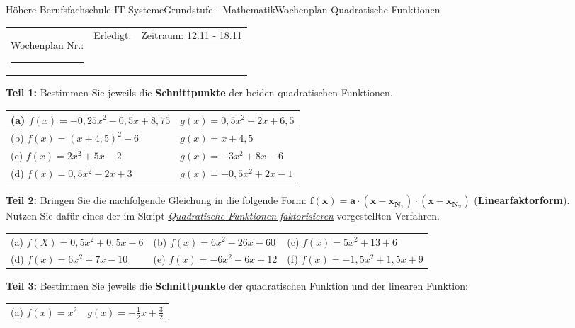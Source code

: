 \documentclass[oneside,openany,headings=optiontotoc,11pt,numbers=noenddot]{scrreprt}
\begin{document}
	\begin{worksheet}{Höhere Berufsfachschule IT-Systeme}{Grundstufe - Mathematik}{Wochenplan Quadratische Funktionen}
		\noindent
		\begin{tabularx}{\textwidth}{XXl}
			Wochenplan Nr.: \rule{0.15\textwidth}{1pt} & Erledigt: & Zeitraum: \underline{12.11 - 18.11}
		\end{tabularx}
	
		\begin{framed}
			\noindent
			\textbf{Teil 1:} Bestimmen Sie jeweils die \textbf{Schnittpunkte} der beiden quadratischen Funktionen.\\
			\par\noindent
			\begin{tabularx}{\textwidth}{XX}
				(a) \(f(x) = -0,25x^2-0,5x+8,75\) & \(g(x) = 0,5x^{2}- 2x +6,5\)\\
				\hline
				(b) \(f(x) = (x+4,5)^2 -6\) & \(g(x) = x+4,5\)\\
				\hline
				(c) \(f(x) = 2x^2+5x-2\) & \(g(x) = -3x^2+8x-6\)\\
				\hline
				(d) \(f(x) = 0,5x^2-2x+3\) & \(g(x) = -0,5x^2+2x-1\)
			\end{tabularx}
		\end{framed}
		\begin{framed}
			\noindent
			\textbf{Teil 2:} Bringen Sie die nachfolgende Gleichung in die folgende Form: \(\mathbf{f(x) = a\cdot{}(x-x_{N_1})\cdot(x-x_{N_2})}\) (\textbf{Linearfaktorform}).\\
			Nutzen Sie dafür eines der im Skript \textit{\underline{Quadratische Funktionen faktorisieren}} vorgestellten Verfahren.\\
			\par\noindent
			\begin{tabularx}{\textwidth}{XXX}
				(a) \( f(X) = 0,5x^2+0,5x-6\) & (b) \(f(x) = 6x^2-26x-60\) & (c) \(f(x) = 5x^2+13+6\)\\
				(d) \(f(x) = 6x^2+7x-10\) & (e) \(f(x) = -6x^2 -6x +12\) & (f) \(f(x) = -1,5x^2+1,5x+9\)
			\end{tabularx}
		\end{framed}
		\begin{framed}
			\noindent
			\textbf{Teil 3:} Bestimmen Sie jeweils die \textbf{Schnittpunkte} der quadratischen Funktion und der linearen Funktion:\\
			\par\noindent
			\begin{tabularx}{\textwidth}{XX}
				(a) \(f(x) = x^2\) & \(g(x) = -\frac{1}{2}x + \frac{3}{2}\)\\

\end{tabularx}
\end{framed}
\end{worksheet}
\end{document}
